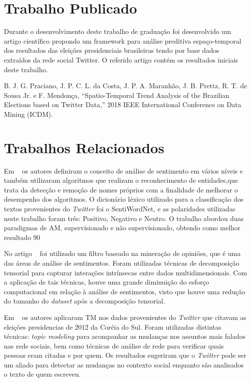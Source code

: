 \section{Trabalho Publicado}

Durante o desenvolvimento deste trabalho de graduação foi desenvolvido um artigo científico propondo um framework para análise preditiva espaço-temporal 
dos resultados das eleições presidenciais brasileiras tendo por base dados extraídos da rede social Twitter. 
O referido artigo contém os resultados iniciais deste trabalho.


B. J. G. Praciano, J. P. C. L. da Costa, J. P. A. Maranhão, J. B. Prettz, R. T. de Sousa Jr. e F. Mendonça, “Spatio-Temporal Trend Analysis of the Brazilian Elections based on Twitter Data,”  2018 IEEE International Conference on Data Mining (ICDM).


\section{Trabalhos Relacionados}

Em ~\cite{8474783} os autores definiram o conceito de análise de sentimento em vários níveis e também utilizaram algoritmos que realizam o reconhecimento de entidades,que trata da detecção e remoção de nomes próprios com a finalidade de melhorar o desempenho dos algoritmos. 
O dicionário léxico utilizado para a classificação
dos textos provenientes do \textit{Twitter} foi o SentiWordNet, e as polaridades utilizadas neste trabalho foram três: Positivo, Negativo e Neutro. O trabalho abordou duas 
paradigmas de \acrshort{AM}, supervisionado e não supervisionado, obtendo como melhor resultado 90%


No artigo ~\cite{6413737} foi utilizado um filtro baseado na mineração de opiniões, que é uma das áreas de análise de sentimentos. Foram utilizadas técnicas de decomposição 
tensorial para capturar interações intrínsecas entre dados multidimensionais. Com a aplicação de tais técnicas,
houve uma grande diminuição do esforço computacional em relação à análise de sentimentos, visto que houve uma redução do tamanho do \textit{dataset} após a decomposição 
tensorial.

Em ~\cite{song2014analyzing} os autores aplicaram \acrshort{TM} nos dados provenientes do \textit{Twitter} que citavam as eleições presidencias de 2012 da Coréia do Sul. 
Foram utilizadas distintas técnicas: \textit{topic modeling} para acompanhar as mudanças nos assuntos mais falados nas rede sociais, bem como técnicas de análise de rede para verificar quais pessoas eram citadas e por quem. 
Os resultados sugeriram que o \textit{Twitter} pode ser um aliado para detectar as mudanças no 
contexto social enquanto são analisados o texto de quem escreveu.


